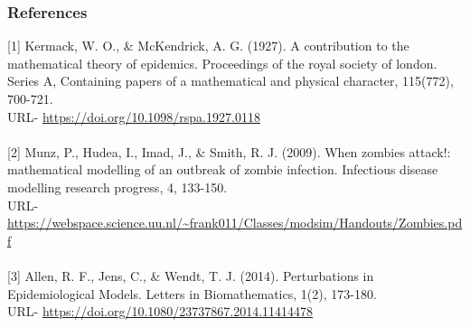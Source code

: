 \documentclass{beamer}
\begin{document}
\begin{frame}
\frametitle{References}

\scriptsize{[1] Kermack, W. O., \& McKendrick, A. G. (1927). A contribution to the mathematical theory of epidemics. Proceedings of the royal society of london. Series A, Containing papers of a mathematical and physical character, 115(772), 700-721. \\
URL- \url{https://doi.org/10.1098/rspa.1927.0118}} \\
~\\

\scriptsize{[2] Munz, P., Hudea, I., Imad, J., \& Smith, R. J. (2009). When zombies attack!: mathematical modelling of an outbreak of zombie infection. Infectious disease modelling research progress, 4, 133-150. \\
URL- \url{https://webspace.science.uu.nl/~frank011/Classes/modsim/Handouts/Zombies.pdf}}\\
~\\

\scriptsize{[3] Allen, R. F., Jens, C., \& Wendt, T. J. (2014). Perturbations in Epidemiological Models. Letters in Biomathematics, 1(2), 173-180. \\
URL- \url{https://doi.org/10.1080/23737867.2014.11414478}} \\
\end{frame}



\begin{frame}
\frametitle{}

\begin{center}
\textsc{}\\
\end{center}
\end{frame}
\end{document}
